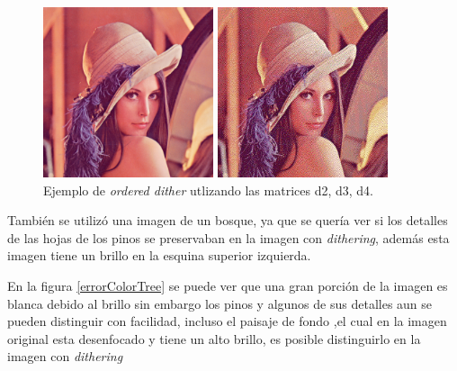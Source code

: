 \documentclass[conference]{IEEEtran}
\begin{document}
\begin{figure}[htbp]
\centerline{\includegraphics[height=50mm]{code/lena}}
\centerline{\includegraphics[height=50mm]{code/Fig1}}
\caption{Ejemplo de \textit{ordered dither} utlizando las matrices d2, d3, d4.}
\label{errorColorLena}
\end{figure}

También se utilizó una imagen de un bosque, ya que se quería ver si los detalles de las hojas de los pinos se preservaban en la imagen con \textit{dithering}, además esta imagen tiene un brillo en la esquina superior izquierda.

En la figura \ref{errorColorTree} se puede ver que una gran porción de la imagen es blanca debido al brillo sin embargo los pinos y algunos de sus detalles aun se pueden distinguir con facilidad, incluso el paisaje de fondo ,el cual en la imagen original  esta desenfocado y tiene un alto brillo, es posible distinguirlo en la imagen con \textit{dithering}

\end{document}
